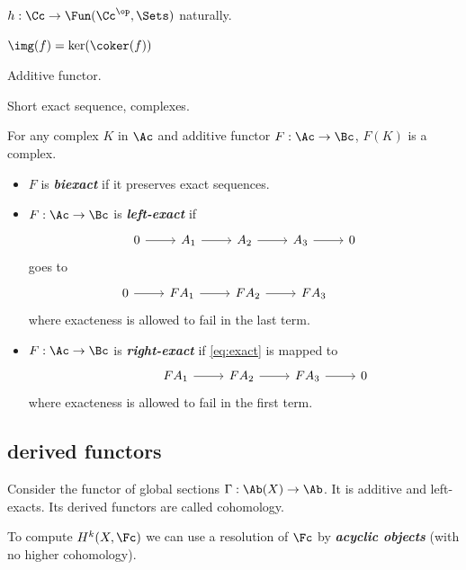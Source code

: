 \begin{lemma}[Yoneda]
	$h:\Cc\to\Fun(\Cc^{\op},\Sets)$ naturally.
\end{lemma}
\begin{defn}
	$\img(f)=\ker(\coker(f))$
\end{defn}
\begin{defn}
	Additive functor.
\end{defn}
\begin{defn}
	Short exact sequence, complexes.
\end{defn}
\begin{remark}
	For any complex $K$ in $\Ac$ and additive functor $F:\Ac\to\Bc$, $F(K)$ is a complex.
\end{remark}
\begin{defn}
	\begin{itemize}
		\item $F$ is \textbf{\textit{biexact}} if it preserves exact sequences.
		\item $F:\Ac\to\Bc$ is \textbf{\textit{left-exact}} if 
		\begin{equation}\label{eq:exact}
			\begin{tikzcd}
			0\arrow[r]&A_1\arrow[r]&A_2\arrow[r]&A_3\arrow[r]&0
		\end{tikzcd}
		\end{equation}
		goes to
		\[\begin{tikzcd}
			0\arrow[r]&FA_1\arrow[r]&FA_2\arrow[r]&FA_3\arrow[r,phantom]& \leavevmode
		\end{tikzcd}\]
		where exacteness is allowed to fail in the last term.
		\item $F:\Ac\to\Bc$ is \textbf{\textit{right-exact}} if \cref{eq:exact} is mapped to
		\[\begin{tikzcd}
			\leavevmode\arrow[r,phantom]&FA_1\arrow[r]&FA_2\arrow[r]&FA_3\arrow[r]& 0
		\end{tikzcd}\]
		where exacteness is allowed to fail in the first term.
	\end{itemize}
\end{defn}

\subsection{derived functors}
Consider the functor of global sections $\Gamma:\Ab(X)\to\Ab$. It is additive and left-exacts. Its derived functors are called cohomology.

To compute $H^k(X,\Fc)$ we can use a resolution of $\Fc$ by \textbf{\textit{acyclic objects}} (with no higher cohomology).

